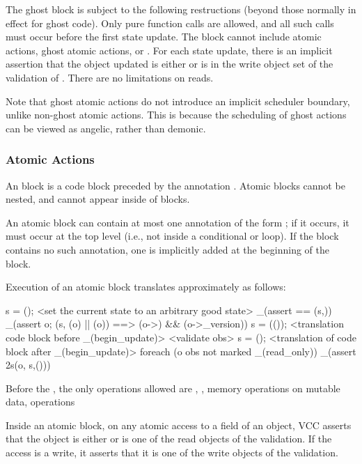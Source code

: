\documentclass[preprint,nocopyrightspace]{sigplanconf}
\begin{document}
{{{The ghost block is subject to the following restructions (beyond those
normally in effect for ghost code). Only pure function calls are
allowed, and all such calls must occur before the first state update. The
block cannot include atomic actions, ghost atomic
actions,  or . For each state update,
there is an implicit assertion that the object updated is
either \vcc{\mutable} or is in the write object set of the validation
of . There are no limitations on reads.

Note that ghost atomic actions do not introduce an implicit scheduler
boundary, unlike non-ghost atomic actions. This is because the
scheduling of ghost actions can be viewed as angelic, rather than
demonic.

\subsubsection{Atomic Actions}

An  block is a code block preceded by the
annotation . Atomic blocks cannot be nested, and
cannot appear inside of  blocks. 

An atomic block can contain at most one annotation of the
form ; if it occurs, it must occur at the top
level (i.e., not inside a conditional or loop). If the block contains
no such annotation, one is implicitly added at the beginning of the
block. 

Execution of an atomic block translates approximately as follows:
\begin{VCC}
\state s = \now();
<set the current state to an arbitrary good state>
_(assert \me == \at(s,\me))
_(assert \forall \object o; \at(s, \wrapped(o) || \mutable(o))
    ==> \unchanged(o->\version) && \unchanged(o->\volatile_version))
s = \stutter(\now());
<translation code block before _(begin_update)>
<validate obs>
s = \now();
<translation of code block after _(begin_update)>
foreach (\object o \in obs not marked _(read_only))
  _(assert \inv2s(o, s,\now()))
\end{VCC}

Before the , the only operations allowed
are , , memory operations on mutable data,
 operations 

Inside an atomic block, on any atomic access to a field of an object,
VCC asserts that the object is either \vcc{\mutable} or is one of the
read objects of the validation. If the access is a write, it asserts
that it is one of the write objects of the validation.

}}}
\end{document}
